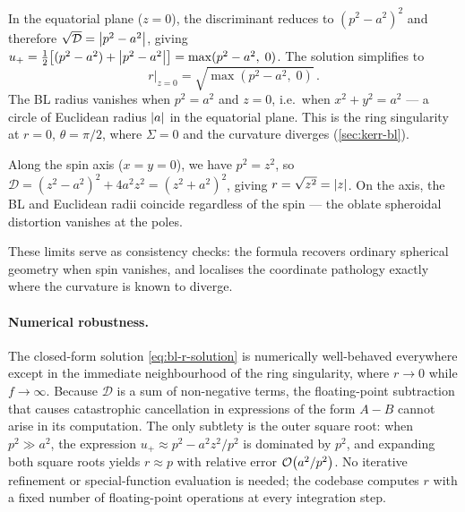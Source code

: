 In the equatorial plane ($z = 0$), the discriminant reduces to
$(p^2 - a^2)^2$ and therefore
$\sqrt{\mathcal{D}} = \left\lvert p^2 - a^2 \right\rvert$, giving
$u_+ = \tfrac{1}{2}\bigl[(p^2-a^2) + \left\lvert p^2-a^2 \right\rvert\bigr]
= \max(p^2 - a^2,\; 0)$.
The solution simplifies to
%
\begin{equation}
  r\big|_{z=0} = \sqrt{\max(p^2 - a^2,\; 0)} \,.
  \label{eq:bl-equatorial}
\end{equation}
%
The BL radius vanishes when $p^2 = a^2$ and $z = 0$,
i.e.\ when $x^2 + y^2 = a^2$ --- a circle of Euclidean radius
$\left\lvert a \right\rvert$ in the equatorial plane.  This is the ring singularity at
$r = 0$, $\theta = \pi/2$, where $\Sigma = 0$ and the curvature
diverges (\cref{sec:kerr-bl}).

Along the spin axis ($x = y = 0$), we have $p^2 = z^2$, so
$\mathcal{D} = (z^2 - a^2)^2 + 4a^2 z^2 = (z^2 + a^2)^2$, giving
$r = \sqrt{z^2} = \left\lvert z \right\rvert$.  On the axis, the BL and Euclidean
radii coincide regardless of the spin --- the oblate spheroidal
distortion vanishes at the poles.

These limits serve as consistency checks: the formula recovers
ordinary spherical geometry when spin vanishes, and localises the
coordinate pathology exactly where the curvature is known to diverge.

\paragraph{Numerical robustness.}

The closed-form solution \cref{eq:bl-r-solution} is numerically
well-behaved everywhere except in the immediate neighbourhood of
the ring singularity, where $r \to 0$ while $f \to \infty$.
Because $\mathcal{D}$ is a sum of non-negative terms, the
floating-point subtraction that causes catastrophic cancellation in
expressions of the form $A - B$ cannot arise in its computation.
The only subtlety is the outer square root: when $p^2 \gg a^2$, the
expression $u_+ \approx p^2 - a^2 z^2/p^2$ is dominated by $p^2$,
and expanding both square roots yields $r \approx p$ with relative
error $\mathcal{O}\!\left(a^2/p^2\right)$.  No iterative refinement or
special-function evaluation is needed; the codebase computes $r$
with a fixed number of floating-point operations at every
integration step.
